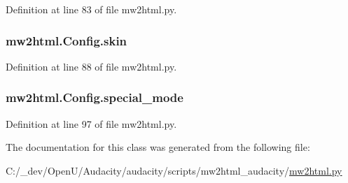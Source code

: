 Definition at line 83 of file mw2html.\+py.

\subsubsection[{\texorpdfstring{skin}{skin}}]{\setlength{\rightskip}{0pt plus 5cm}mw2html.\+Config.\+skin}\hypertarget{classmw2html_1_1_config_a2f8db9afd3422531379dbb9795c595be}{}\label{classmw2html_1_1_config_a2f8db9afd3422531379dbb9795c595be}


Definition at line 88 of file mw2html.\+py.

\subsubsection[{\texorpdfstring{special\+\_\+mode}{special_mode}}]{\setlength{\rightskip}{0pt plus 5cm}mw2html.\+Config.\+special\+\_\+mode}\hypertarget{classmw2html_1_1_config_a873d1381c06bf818051740e91347054b}{}\label{classmw2html_1_1_config_a873d1381c06bf818051740e91347054b}


Definition at line 97 of file mw2html.\+py.



The documentation for this class was generated from the following file\+:\begin{DoxyCompactItemize}
\item 
C\+:/\+\_\+dev/\+Open\+U/\+Audacity/audacity/scripts/mw2html\+\_\+audacity/\hyperlink{mw2html_8py}{mw2html.\+py}\end{DoxyCompactItemize}
